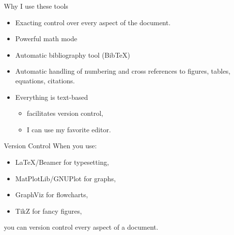 \documentclass[12pt]{beamer}
\begin{document}
\begin{frame}{Why I use these tools}

\begin{itemize}
\item{Exacting control over every aspect of the document.}
\item{Powerful math mode}
\item{Automatic bibliography tool (Bib\TeX)}
\item{Automatic handling of numbering and cross references to figures, tables, equations, citations.}
\item{Everything is text-based}
\begin{itemize}
\item{facilitates version control,}
\item{I can use my favorite editor.}
\end{itemize}
\end{itemize}
\end{frame}

\begin{frame}{Version Control}
When you use:
\begin{itemize}
\item \LaTeX/Beamer for typesetting,
\item MatPlotLib/GNUPlot for graphs,
\item GraphViz for flowcharts,
\item TikZ for fancy figures,
\end{itemize}

you can version control every aspect of a document.\\
\end{frame}

\end{document}
